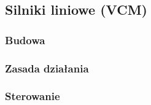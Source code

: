 \subsection{Silniki liniowe (VCM)}

\subsubsection{Budowa}

\subsubsection{Zasada działania}

\subsubsection{Sterowanie}

\clearpage

